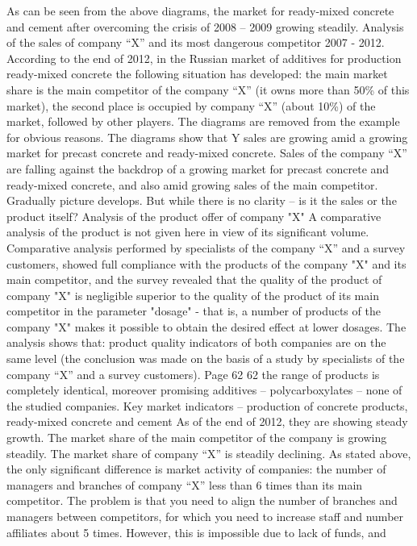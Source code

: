 As can be seen from the above diagrams, the market for ready-mixed concrete and cement after
overcoming the crisis of 2008 -- 2009 growing steadily.
Analysis of the sales of company “X” and its most dangerous competitor 2007 -
2012.
According to the end of 2012, in the Russian market of additives for production
ready-mixed concrete the following situation has developed: the main market share is
the main competitor of the company “X” (it owns more than 50\% of this market),
the second place is occupied by company “X” (about 10\%) of the market, followed by other players.
The diagrams are removed from the example for obvious reasons. The diagrams show that
Y sales are growing amid a growing market for precast concrete and ready-mixed concrete.
Sales of the company “X” are falling against the backdrop of a growing market for precast concrete and ready-mixed concrete, and
also amid growing sales of the main competitor. Gradually picture
develops. But while there is no clarity -- is it the sales or the product itself?
Analysis of the product offer of company "X"
A comparative analysis of the product is not given here in view of its significant
volume.
Comparative analysis performed by specialists of the company “X” and a survey
customers, showed full compliance with the products of the company "X" and its main
competitor, and the survey revealed that the quality of the product of company "X" is negligible
superior to the quality of the product of its main competitor in the parameter "dosage" -
that is, a number of products of the company "X" makes it possible to obtain the desired effect
at lower dosages.
The analysis shows that:
product quality indicators of both companies are on the same level
(the conclusion was made on the basis of a study by specialists of the company “X” and a survey
customers).
Page 62
62
the range of products is completely identical, moreover
promising additives -- polycarboxylates -- none of the studied
companies.
Key market indicators -- production of concrete products, ready-mixed concrete and cement
As of the end of 2012, they are showing steady growth.
The market share of the main competitor of the company is growing steadily.
The market share of company “X” is steadily declining.
As stated above, the only significant difference is
market activity of companies: the number of managers and branches of company “X”
less than 6 times than its main competitor.
The problem is that you need to align the number of branches and
managers between competitors, for which you need to increase staff and number
affiliates about 5 times. However, this is impossible due to lack of funds, and
